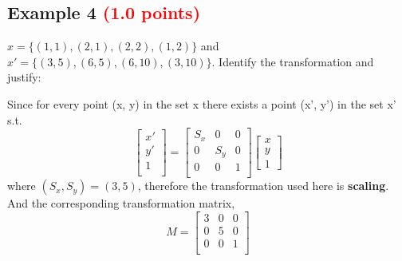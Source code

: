 \documentclass[answers]{exam}
\newcommand{\mypoints}[1]{\textcolor{red}{(#1 points)}}
\begin{document}
\subsection{Example 4 \mypoints{1.0}}
$x = \{(1,1), (2,1), (2,2), (1,2)\}$ and $x' = \{(3,5), (6,5), (6,10), (3,10)\}$. Identify the transformation and justify:
\begin{solution}
Since for every point (x, y) in the set x there exists a point (x', y') in the set x' s.t. \\
$$
\begin{bmatrix} 
x'\\
y'\\
1\\
\end{bmatrix}
=
\begin{bmatrix}
S_x & 0 & 0\\
0 & S_y & 0\\
0 & 0 & 1\\
\end{bmatrix}
\begin{bmatrix}
x\\
y\\
1
\end{bmatrix}
$$
where $(S_x, S_y) = (3, 5)$, therefore the transformation used here is \textbf{scaling}.\\
And the corresponding transformation matrix,\\
$$M = \begin{bmatrix}
3 & 0 & 0\\
0 & 5 & 0\\
0 & 0 & 1\\
\end{bmatrix}
$$
\end{solution}
\end{document}
